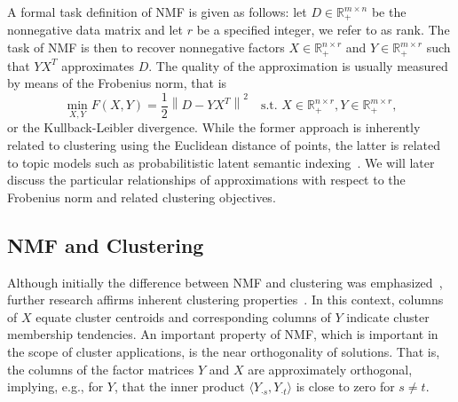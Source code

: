 A formal task definition of NMF is given as follows: let $D\in\mathbb{R}_+^{m\times n}$ be the nonnegative data matrix and let $r$ be a specified integer, we refer to as rank. The task of NMF is then to recover nonnegative factors $X\in \mathbb{R}_+^{n\times r}$ and $Y\in \mathbb{R}_+^{m\times r}$ such that $YX^T$ approximates $D$. The quality of the approximation is usually measured by means of the Frobenius norm, that is
\begin{equation}
	\min_{X,Y} F(X,Y) = \frac{1}{2}\left\|D-YX^T\right\|^2 \quad \text{s.t. }X\in \mathbb{R}_+^{n\times r}, Y\in \mathbb{R}_+^{m\times r},\label{eq:NMF} \tag{NMF}
\end{equation}
or the Kullback-Leibler divergence. While the former approach is inherently related to clustering using the Euclidean distance of points, the latter is related to topic models such as probabilitistic latent semantic indexing~\citep{gaussier2005relation,ding2006nonnegative}. We will later discuss the particular relationships of approximations with respect to the Frobenius norm and related clustering objectives. 
\subsection{NMF and Clustering} \label{sec:ZS:NMFClus}
Although initially the difference between NMF and clustering was emphasized~\citep{lee1999learning}, further research affirms inherent clustering properties~\citep{li2006relationships}. In this context, columns of $X$ equate cluster centroids and corresponding columns of $Y$ indicate cluster membership tendencies.
An important property of NMF, which is important in the scope of cluster applications, is the near orthogonality of solutions. That is, the columns of the factor matrices $Y$ and $X$ are approximately orthogonal, implying, e.g., for $Y$, that the inner product $\langle Y_{\cdot s},Y_{\cdot t}\rangle$ is close to zero for $s\neq t$.    

